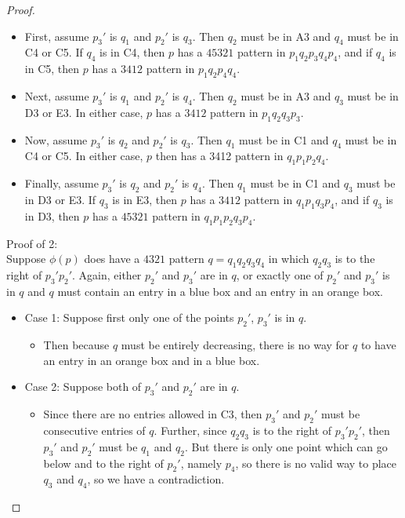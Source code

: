 \documentclass[10pt,a4paper]{amsart}
\begin{document}
\begin{proof}
\begin{itemize}
        \begin{itemize}
            \item First, assume $p_3'$ is $q_1$ and $p_2'$ is $q_3$. Then $q_2$ must be in A3 and $q_4$ must be in C4 or C5.  If $q_4$ is in C4, then $p$ has a $45321$ pattern in $p_1q_2p_3q_4p_4$, and if $q_4$ is in C5, then $p$ has a $3412$ pattern in $p_1q_2p_4q_4$.
            \item Next, assume $p_3'$ is $q_1$ and $p_2'$ is $q_4$. Then $q_2$ must be in A3 and $q_3$ must be in D3 or E3. In either case, $p$ has a $3412$ pattern in $p_1q_2q_3p_3$.
            \item Now, assume $p_3'$ is $q_2$ and $p_2'$ is $q_3$. Then $q_1$ must be in C1 and $q_4$ must be in C4 or C5. In either case, $p$ then has a 3412 pattern in $q_1p_1p_2q_4$.
            \item Finally, assume $p_3'$ is $q_2$ and $p_2'$ is $q_4$. Then $q_1$ must be in C1 and $q_3$ must be in D3 or E3. If $q_3$ is in E3, then $p$ has a $3412$ pattern in $q_1p_1q_3p_4$, and if $q_3$ is in D3, then $p$ has a $45321$ pattern in $q_1p_1p_2q_3p_4$. 
        \end{itemize}
    \end{itemize}  

    \vspace{10pt}

    
    Proof of 2:
    \\
    Suppose $\phi(p)$ does have a $4321$ pattern $q=q_1q_2q_3q_4$ in which $q_2q_3$ is to the right of $p_3'p_2'$. Again, either $p_2'$ and $p_3'$ are in $q$, or exactly one of $p_2'$ and $p_3'$ is in $q$ and $q$ must contain an entry in a blue box and an entry in an orange box. 

    \begin{itemize}
        \item Case 1: Suppose first only one of the points $p_2'$, $p_3'$ is in $q$.
        \begin{itemize}
            \item Then because $q$ must be entirely decreasing, there is no way for $q$ to have an entry in an orange box and in a blue box. 
        \end{itemize}
        
        \item Case 2: Suppose both of $p_3'$ and $p_2'$ are in $q$. 
        \begin{itemize}
            \item Since there are no entries allowed in C3, then $p_3'$ and $p_2'$ must be consecutive entries of $q$. Further, since $q_2q_3$ is to the right of $p_3'p_2'$, then $p_3'$ and $p_2'$ must be $q_1$ and $q_2$. But there is only one point which can go below and to the right of $p_2'$, namely $p_4$, so there is no valid way to place $q_3$ and $q_4$, so we have a contradiction. 
        \end{itemize}
        

\end{itemize}
\end{proof}
\end{document}
